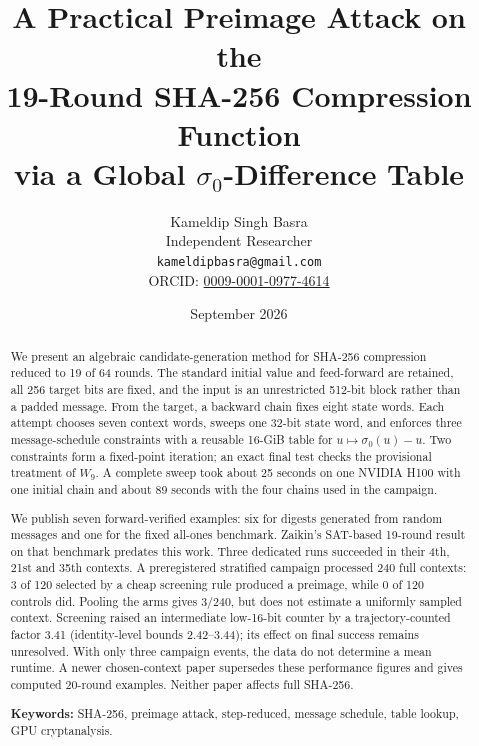 \documentclass[11pt,a4paper]{article}
\begin{document}
\title{\textbf{A Practical Preimage Attack on the\\
       19-Round SHA-256 Compression Function\\
       via a Global \texorpdfstring{$\sigma_0$}{sigma0}-Difference Table}}

\author{Kameldip Singh Basra \\[4pt]
        \small Independent Researcher \\
        \small \texttt{kameldipbasra@gmail.com} \\
        \small ORCID: \href{https://orcid.org/0009-0001-0977-4614}{0009-0001-0977-4614}}

\date{September 2026}

\maketitle

\begin{abstract}
We present an algebraic candidate-generation method for SHA-256 compression
reduced to 19 of 64 rounds.  The standard initial value and feed-forward are
retained, all 256 target bits are fixed, and the input is an unrestricted
512-bit block rather than a padded message.  From the target, a backward chain
fixes eight state words.  Each attempt chooses seven context words, sweeps one
32-bit state word, and enforces three message-schedule constraints with a
reusable 16-GiB table for $u\mapsto\sigma_0(u)-u$.  Two constraints form a
fixed-point iteration; an exact final test checks the provisional treatment
of $W_9$.  A complete sweep took about 25 seconds on one NVIDIA H100 with one
initial chain and about 89 seconds with the four chains used in the campaign.

We publish seven forward-verified examples: six for digests generated from
random messages and one for the fixed all-ones benchmark.  Zaikin's SAT-based
19-round result on that benchmark predates this work.  Three dedicated runs
succeeded in their 4th, 21st and 35th contexts.  A preregistered stratified
campaign processed 240 full contexts: 3 of 120 selected by a cheap screening
rule produced a preimage, while 0 of 120 controls did.  Pooling the arms gives
3/240, but does not estimate a uniformly sampled context.  Screening raised
an intermediate low-16-bit counter by a trajectory-counted factor 3.41
(identity-level bounds 2.42--3.44); its effect on final success remains
unresolved.  With only three campaign events, the data do not determine a
mean runtime.  A newer chosen-context paper supersedes these performance
figures and gives computed 20-round examples.  Neither paper
affects full SHA-256.

\medskip
\noindent\textbf{Keywords:} SHA-256, preimage attack, step-reduced,
message schedule, table lookup, GPU cryptanalysis.
\end{abstract}
\end{document}
